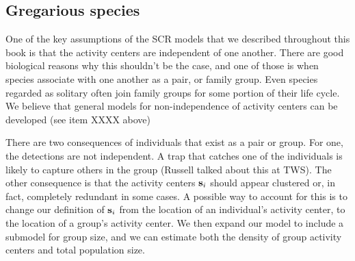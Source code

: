 \subsection{Gregarious species}

One of the key assumptions of the SCR models that we described
throughout this book is that the activity centers are independent of
one another.  There are good biological reasons why this shouldn't be
the case, and one of those is when species associate with one another
as a pair, or family group.
 Even species regarded as solitary often join family
groups for some portion of their life cycle.  We believe that general
models for non-independence of activity centers can be developed (see
item XXXX above) 


There are two consequences of individuals that exist as a pair or
group. For one, the detections are not independent. A trap that
catches one of the individuals is likely to capture others in the
group (Russell talked about this at TWS). The other consequence is
that the activity centers ${\bf s}_{i}$ should appear clustered or, in
fact, completely redundant in some cases. 
A possible way to account for this 
is to change our definition of ${\bf s}_i$ from the
location of an individual's activity center, to the location of a
group's activity center. We then expand our model to include a
submodel for group size, and we can estimate both the density of group
activity centers and total population size.



